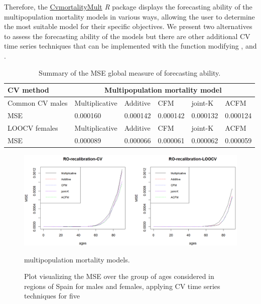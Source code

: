 Therefore, the \href{https://cran.r-project.org/web/packages/CvmortalityMult/index.html}{CvmortalityMult} \emph{R} package displays the forecasting ability of the multipopulation mortality models in various ways, allowing the user to determine the most suitable model for their specific objectives.  We present two alternatives to assess the forecasting ability of the models but there are other additional CV time series techniques that can be implemented with the  function modifying ,  and .

\begin{table}[!t]
\centering
\begin{tabular}{llllll}
\hline
CV method & \multicolumn{5}{c}{Multipopulation mortality model} \\
\hline
Common CV males & Multiplicative & Additive & CFM & joint-K & ACFM \\
MSE & 0.000160 & 0.000142 & 0.000142 & 0.000132 & 0.000124 \\
\hline
\hline
LOOCV females & Multiplicative & Additive & CFM & joint-K & ACFM \\
MSE & 0.000089 & 0.000066 & 0.000061 & 0.000062 & 0.000059 \\
\hline
\end{tabular}
\caption{\label{T_GlobalMEAS} Summary of the MSE global measure of forecasting ability.}
\end{table}

\begin{figure}[h!]
\centering
\includegraphics*[width=\textwidth]{MSE_ages.png}
\caption{Plot visualizing the MSE over the group of ages considered in regions of Spain for males and females, applying CV time series techniques for five} multipopulation mortality models.
\label{MSE_ages}
\end{figure}

